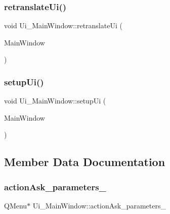 \subsubsection{\texorpdfstring{retranslate\+Ui()}{retranslateUi()}}
{\footnotesize\ttfamily void Ui\+\_\+\+Main\+Window\+::retranslate\+Ui (\begin{DoxyParamCaption}\item[{Q\+Main\+Window $\ast$}]{Main\+Window }\end{DoxyParamCaption})\hspace{0.3cm}{\ttfamily [inline]}}

\hypertarget{class_ui___main_window_acf4a0872c4c77d8f43a2ec66ed849b58}{}\label{class_ui___main_window_acf4a0872c4c77d8f43a2ec66ed849b58} 
\subsubsection{\texorpdfstring{setup\+Ui()}{setupUi()}}
{\footnotesize\ttfamily void Ui\+\_\+\+Main\+Window\+::setup\+Ui (\begin{DoxyParamCaption}\item[{Q\+Main\+Window $\ast$}]{Main\+Window }\end{DoxyParamCaption})\hspace{0.3cm}{\ttfamily [inline]}}



\subsection{Member Data Documentation}
\hypertarget{class_ui___main_window_aac5d8ae11f873406a74687ee5f691715}{}\label{class_ui___main_window_aac5d8ae11f873406a74687ee5f691715} 
\subsubsection{\texorpdfstring{action\+Ask\+\_\+parameters\+\_}{actionAsk\_parameters\_2}}
{\footnotesize\ttfamily Q\+Menu$\ast$ Ui\+\_\+\+Main\+Window\+::action\+Ask\+\_\+parameters\+\_}

\hypertarget{class_ui___main_window_a74d62fabdcffd1597d0df9c7688fac25}{}\label{class_ui___main_window_a74d62fabdcffd1597d0df9c7688fac25} 

